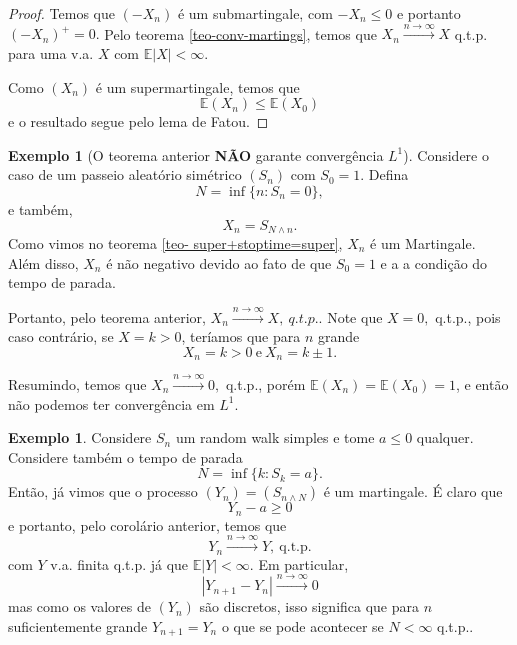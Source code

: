 \documentclass[12pt,a4paper,oneside]{book}
\theoremstyle{definition}
\newtheorem{example}[theorem]{Exemplo}
\theoremstyle{remark}
\numberwithin{equation}{section}
\newcommand{\E}{\mathbb{E}}
\newcommand{\rarrowlimn}{\xrightarrow{n\rightarrow \infty}}
\begin{document}
\begin{proof}
Temos que $(-X_n)$ é um submartingale, com $-X_n\leq 0$ e portanto $(-X_n)^+ = 0.$ Pelo teorema \ref{teo-conv-martings}, temos que $X_n \rarrowlimn X$ q.t.p. para uma v.a. $X$ com $\E |X|<\infty.$

Como $(X_n)$ é um supermartingale, temos que
$$\E(X_n)\leq \E(X_0) $$
e o resultado segue pelo lema de Fatou.
\end{proof}




\begin{tcolorbox}
\begin{example}[O teorema anterior \textbf{NÃO} garante convergência $L^1$]
Considere o caso de um passeio aleatório simétrico $(S_n)$ com $S_0 = 1$. Defina 
$$N= \inf\{n: S_n = 0 \}, $$
e  também,
$$X_n = S_{N\wedge n}. $$
Como vimos no teorema \ref{teo- super+stoptime=super}, $X_n$ é um  Martingale. Além disso, $X_n$ é não negativo devido ao fato de que $S_0=1$ e a a condição do tempo de parada.

Portanto, pelo teorema anterior,  $X_n \rarrowlimn X,\ q.t.p.$.
Note que $X=0,$ q.t.p., pois caso contrário, se $X=k>0$, teríamos que para $n$ grande
$$X_n = k>0\ \textrm{e}\ X_n = k\pm 1. $$

Resumindo, temos que $X_n \rarrowlimn 0,$ q.t.p., porém $\E(X_n) = \E(X_0)=1$, e então não podemos ter convergência em $L^1.$
\end{example}
\end{tcolorbox}




\begin{example}
Considere $S_n$ um random walk simples e tome $a\leq 0$ qualquer. Considere também o tempo de parada 
$$N = \inf\{k: S_k = a\}.$$
Então, já vimos que o processo $(Y_n) = (S_{n\wedge N})$ é um martingale.
É claro que 
$$Y_n-a \geq 0$$
e portanto, pelo corolário anterior, temos que 
$$Y_n \rarrowlimn Y,\ \textrm{q.t.p.} $$
com $Y$ v.a. finita q.t.p. já que $\E|Y|<\infty$.
Em particular,
$$|Y_{n+1}-Y_n| \rarrowlimn 0 $$ 
mas como os valores de $(Y_n)$ são discretos, isso significa que para $n$ suficientemente grande $Y_{n+1}=Y_n$ o que se pode acontecer se $N<\infty$ q.t.p.. 
\end{example}
\end{document}
